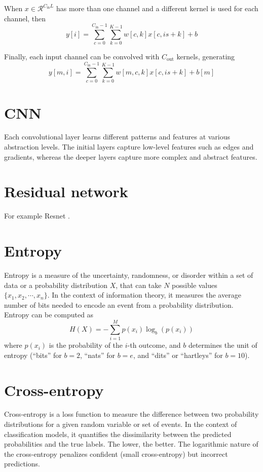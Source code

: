 When $x\in\mathcal{R}^{C_{\text{in}}L}$ has more than one channel and
a different kernel is used for each channel, then
\begin{equation}
  y[i] = \sum_{c=0}^{C_{\text{in}}-1}\sum_{k=0}^{K-1} w[c,k]x[c,is+k]+b
\end{equation}

Finally, each input channel can be convolved with $C_{\text{out}}$ kernels, generating
\begin{equation}
  y[m,i] = \sum_{c=0}^{C_{\text{in}}-1}\sum_{k=0}^{K-1} w[m,c,k]x[c,is+k]+b[m]
\end{equation}

\section{CNN}
Each convolutional layer learns different patterns and features at
various abstraction levels. The initial layers capture low-level features such
as edges and gradients, whereas the deeper layers capture more complex and
abstract features.

\section{Residual network}
For example Resnet \cite{}.

\section{Entropy}
Entropy is a measure of the uncertainty, randomness, or disorder
within a set of data or a probability distribution $X$, that can take
$N$ possible values $\{x_1,x_2,\cdots,x_n\}$. In the context of
information theory, it measures the average number of bits needed to
encode an event from a probability distribution. Entropy can be
computed as
\begin{equation}
  H(X) = -\sum_{i=1}^Mp(x_i)\log_b(p(x_i))
\end{equation}
where $p(x_i)$ is the probability of the $i$-th outcome, and $b$
determines the unit of entropy (``bits'' for $b=2$, ``nats'' for
$b=e$, and ``dits'' or ``hartleys'' for $b=10$).

\section{Cross-entropy}
Cross-entropy is a loss function to measure the difference between two
probability distributions for a given random variable or set of
events. In the context of classification models, it quantifies the
dissimilarity between the predicted probabilities and the true
labels. The lower, the better. The logarithmic nature of the
cross-entropy penalizes confident (small cross-entropy) but incorrect
predictions.

